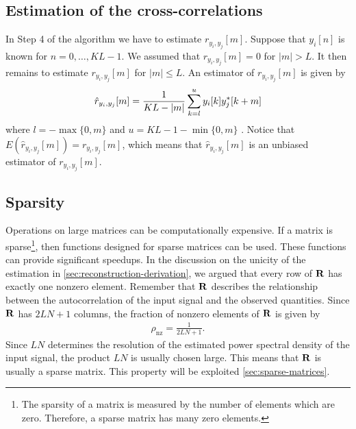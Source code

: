 \documentclass[a4paper, openany, oneside]{memoir}
\begin{document}
\subsection{Estimation of the cross-correlations}
\label{sub:reconstruction-estimation}
In Step 4 of the algorithm we have to estimate $r_{y_i,y_j}[m]$. Suppose that $y_i[n]$ is known for $n = 0,\ldots,KL-1$. We assumed that $r_{y_i,y_j}[m]=0$ for $|m|>L$. It then remains to estimate $r_{y_i,y_j}[m]$ for $|m| \le L$. An estimator of $r_{y_i,y_j}[m]$ is given by
\begin{align} \label{eq:ryij-est}
    \hat{r}_{y_i,y_j}[m] = \frac{1}{KL-|m|}\sum_{k=l}^{u}y_i[k]y^*_j[k+m]
\end{align}
where $l=-\max\{0,m\}$ and $u=KL-1-\min\{0,m\}$ \cite{hayes1996statistical}. Notice that $E(\hat{r}_{y_i,y_j}[m])=r_{y_i,y_j}[m]$, which means that $\hat{r}_{y_i,y_j}[m]$ is an unbiased estimator of $r_{y_i,y_j}[m]$.

\subsection{Sparsity}
\label{sub:reconstruction-sparsity}
Operations on large matrices can be computationally expensive. If a matrix is sparse\footnote{The sparsity of a matrix is measured by the number of elements which are zero. Therefore, a sparse matrix has many zero elements.}, then functions designed for sparse matrices can be used. These functions can provide significant speedups. In the discussion on the unicity of the estimation in \cref{sec:reconstruction-derivation}, we argued that every row of $\boldsymbol{\mathbf{R}}$ has exactly one nonzero element. Remember that $\boldsymbol{\mathbf{R}}$ describes the relationship between the autocorrelation of the input signal and the observed quantities. Since $\boldsymbol{\mathbf{R}}$ has $2LN+1$ columns, the fraction of nonzero elements of $\boldsymbol{\mathbf{R}}$ is given by
\begin{align*}
    \rho_{\text{nz}}=\frac{1}{2LN+1}.
\end{align*}
Since $LN$ determines the resolution of the estimated power spectral density of the input signal, the product $LN$ is usually chosen large. This means that $\boldsymbol{\mathbf{R}}$ is usually a sparse matrix. This property will be exploited \cref{sec:sparse-matrices}.
\end{document}
